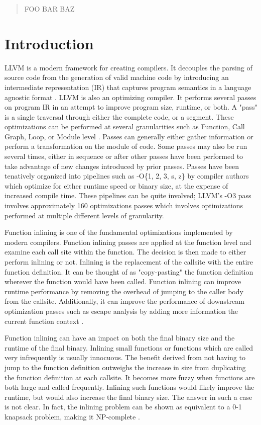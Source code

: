 \documentclass[nohyperref]{article}
\theoremstyle{plain}
\theoremstyle{definition}
\theoremstyle{remark}
\begin{document}
\begin{abstract}
FOO BAR BAZ
\end{abstract}

\section{Introduction}
\label{introduction}
LLVM is a modern framework for creating compilers. It decouples the parsing of source code from the generation of valid machine code by introducing an intermediate representation (IR) that captures program semantics in a language agnostic format \cite{llvm-paper}. LLVM is also an optimizing compiler. It performs several passes on program IR in an attempt to improve program size, runtime, or both. A "pass" is a single traversal through either the complete code, or a segment. These optimizations can be performed at several granularities such as Function, Call Graph, Loop, or Module level \cite{llvm-paper}. Passes can generally either gather information or perform a transformation on the module of code. Some passes may also be run several times, either in sequence or after other passes have been performed to take advantage of new changes introduced by prior passes. Passes have been tenatively organized into pipelines such as -O\{1, 2, 3, s, z\} by compiler authors which optimize for either runtime speed or binary size, at the expense of increased compile time. These pipelines can be quite involved; LLVM's -O3 pass involves approximately 160 optimizations passes which involves optimizations performed at multiple different levels of granularity.


Function inlining is one of the fundamental optimizations implemented by modern compilers. Function inlining passes are applied at the function level and examine each call site within the function. The decision is then made to either perform inlining or not. Inlining is the replacement of the callsite with the entire function definition. It can be thought of as "copy-pasting" the function definition wherever the function would have been called. Function inlining can improve runtime performance by removing the overhead of jumping to the caller body from the callsite. Additionally, it can improve the performance of downstream optimization passes such as escape analysis by adding more information the current function context \cite{Theodoridis_Grosser_Su_2022}.

Function inlining can have an impact on both the final binary size and the runtime of the final binary. Inlining small functions or functions which are called very infrequently is usually innocuous. The benefit derived from not having to jump to the function definition outweighs the increase in size from duplicating the function definition at each callsite. It becomes more fuzzy when functions are both large and called frequently. Inlining such functions would likely improve the runtime, but would also increase the final binary size. The answer in such a case is not clear. In fact, the inlining problem can be shown as equivalent to a 0-1 knapsack problem, making it NP-complete \cite{Theodoridis_Grosser_Su_2022}. 
\end{document}
